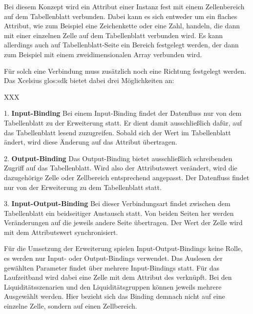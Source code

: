 \begin{onehalfspacing}
Bei diesem Konzept wird ein Attribut einer Instanz fest mit einem Zellenbereich auf dem Tabellenblatt verbunden. Dabei kann es sich entweder um ein flaches Attribut, wie zum Beispiel eine Zeichenkette oder eine Zahl, handeln, die dann mit einer einzelnen Zelle auf dem Tabellenblatt verbunden wird. Es kann allerdings auch auf Tabellenblatt-Seite ein Bereich festgelegt werden, der dann zum Beispiel mit einem zweidimensionalen Array verbunden wird.

Für solch eine Verbindung muss zusätzlich noch eine Richtung festgelegt werden. Das \gls{Xcelsius} \gls{glos:sdk} bietet dabei drei Möglichkeiten an:

\begin{seToplist}{ XXX }

\item[1.] \textbf{Input-Binding} \newline
Bei einem Input-Binding findet der Datenfluss nur von dem Tabellenblatt zu der Erweiterung statt. Er dient damit ausschließlich dafür, auf das Tabellenblatt lesend zuzugreifen. Sobald sich der Wert im Tabellenblatt ändert, wird diese Änderung auf das Attribut übertragen.

\item[2.] \textbf{Output-Binding} \newline
Das Output-Binding bietet ausschließlich schreibenden Zugriff auf das Tabellenblatt. Wird also der Attributswert verändert, wird die dazugehörige Zelle oder Zellbereich entsprechend angepasst. Der Datenfluss findet nur von der Erweiterung zu dem Tabellenblatt statt.

\item[3.] \textbf{Input-Output-Binding} \newline
Bei dieser Verbindungsart findet zwischen dem Tabellenblatt ein beidseitiger Austausch statt. Von beiden Seiten her werden Veränderungen auf die jeweils andere Seite übertragen. Der Wert der Zelle wird mit dem Attributswert synchronisiert.

\end{seToplist}

Für die Umsetzung der Erweiterung spielen Input-Output-Bindings keine Rolle, es werden nur Input- oder Output-Bindings verwendet. Das Auslesen der gewählten Parameter findet über mehrere Input-Bindings statt. Für das Laufzeitband wird dabei eine Zelle mit dem Attribut  des  verknüpft. Bei den Liquiditätsszenarien und den Liquiditätsgruppen können jeweils mehrere Ausgewählt werden. Hier bezieht sich das Binding demnach nicht auf eine einzelne Zelle, sondern auf einen Zellbereich.


\end{onehalfspacing}
